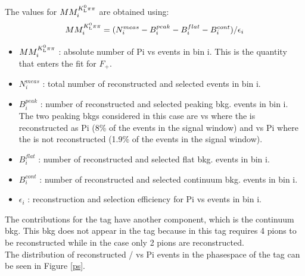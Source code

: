 The values for $MM^{{K^0_{\rm\scriptscriptstyle L}}{\pi}\pi}_i$ are obtained using:
\begin{equation}
MM^{{K^0_{\rm\scriptscriptstyle L}}{\pi}\pi}_i = (N_i^{meas} - B_i^{peak} - B_i^{flat} - B_i^{cont})/ \epsilon_i
\end{equation}
\begin{itemize}
\item $MM^{{K^0_{\rm\scriptscriptstyle L}}{\pi}\pi}_i$ : absolute number of \4Pi vs \KlPiPi events in bin i. This is the quantity that enters the fit for $F_+$.\\
\item $N_i^{meas}$ : total number of reconstructed and selected events in bin i. \\
\item $B_i^{peak}$ : number of reconstructed and selected peaking bkg. events in bin i. The two peaking bkgs considered in this case are \KlPiPi vs \KsPiPi where the \KsPiPi is reconstructed as \4Pi (8\% of the events in the signal window) and \KsPiPi vs \4Pi where the \KS is not reconstructed (1.9\% of the events in the signal window). \\
\item $B_i^{flat}$ : number of reconstructed and selected flat bkg. events in bin i.\\
\item $B_i^{cont}$ : number of reconstructed and selected continuum bkg. events in bin i.\\
\item $\epsilon_i$ : reconstruction and selection efficiency for \4Pi vs \KlPiPi events in bin i. \\
\end{itemize}
The contributions for the \KlPiPi tag have another component, which is the continuum bkg. This bkg does not appear in the \KsPiPi tag because in this tag requires 4 pions to be reconstructed while in the \KlPiPi case only 2 pions are reconstructed.
\\
The distribution of reconstructed \KsPiPi / \KlPiPi vs \4Pi events in the phasespace of the tag can be seen in Figure \ref{ps}.

